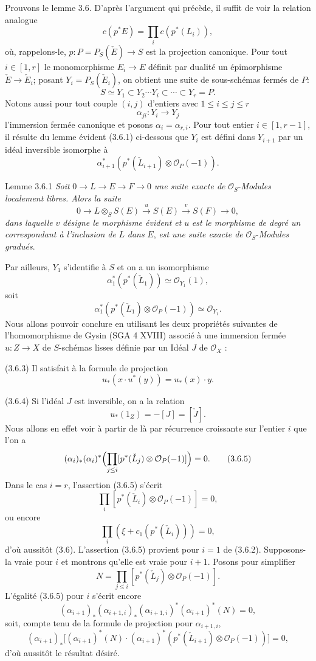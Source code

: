 Prouvons le lemme 3.6. D'après l'argument qui précède, il suffit de voir la relation analogue
\[
c(p^*E)=\prod_i c(p^*(L_i)),
\]
où, rappelons-le, $p:P=P_S(\check E)\to S$ est la projection canonique. Pour tout $i\in[1,r]$ le monomorphisme $E_i\to E$ définit par dualité un épimorphisme $\check E\to\check E_i$; posant $Y_i=P_S(\check E_i)$, on obtient une suite de sous-schémas fermés de $P$:
\[
S\simeq Y_1\subset Y_2\cdots Y_i\subset\cdots\subset Y_r=P.
\]
Notons aussi pour tout couple $(i,j)$ d'entiers avec $1\le i\le j\le r$
\[
\alpha_{ji}:Y_i\to Y_j
\]
l'immersion fermée canonique et posons $\alpha_i=\alpha_{r,i}$. Pour tout entier $i\in[1,r-1]$, il résulte du lemme évident (3.6.1) ci-dessous que $Y_i$ est défini dans $Y_{i+1}$ par un idéal inversible isomorphe à
\[
\alpha_{i+1}^*(p^*(\check L_{i+1})\otimes\mathcal{O}_P(-1)).
\]

\begin{statement}{Lemme 3.6.1}
\emph{Soit} $0\to L\to E\to F\to0$ \emph{une suite exacte de} $\mathcal{O}_S$-\emph{Modules localement libres. Alors la suite}
\[
0\to L\otimes_S S(E)\xrightarrow{u}S(E)\xrightarrow{v}S(F)\to0,
\]
\emph{dans laquelle} $v$ \emph{désigne le morphisme évident et} $u$ \emph{est le morphisme de degré un correspondant à l'inclusion de} $L$ \emph{dans} $E$, \emph{est une suite exacte de} $\mathcal{O}_S$-\emph{Modules gradués}.
\end{statement}

Par
ailleurs, $Y_1$ s'identifie à $S$ et on a un isomorphisme
\[
\alpha_1^*(p^*(\check L_1))\simeq\mathcal{O}_{Y_1}(1),
\]
soit
\[
\alpha_1^*(p^*(\check L_1)\otimes\mathcal{O}_P(-1))\simeq \mathcal{O}_{Y_1}.
\tag{3.6.2.}
\]
Nous allons pouvoir conclure en utilisant les deux propriétés suivantes de l'homomorphisme de Gysin (SGA 4 XVIII) associé à une immersion fermée $u:Z\to X$ de $S$-schémas lisses définie par un Idéal $J$ de $\mathcal{O}_X$ :

(3.6.3) Il satisfait à la formule de projection
\[
u_*(x\cdot u^*(y))=u_*(x)\cdot y.
\]

(3.6.4) Si l'idéal $J$ est inversible, on a la relation
\[
u_*(1_Z)=-[J]=[\check J].
\]
Nous allons en effet voir à partir de là par récurrence croissante sur l'entier $i$ que l'on a
\[
(\alpha_i)_*(\alpha_i)^*\Bigl(\prod_{j\le i}[p^*(\check L_j)\otimes\mathcal{O}_P(-1)]\Bigr)=0.
\tag{3.6.5}
\]
Dans le cas $i=r$, l'assertion (3.6.5) s'écrit
\[
\prod_i[p^*(\check L_i)\otimes\mathcal{O}_P(-1)]=0,
\]
ou encore
\[
\prod_i(\xi+c_1(p^*(\check L_i)))=0,
\]
d'où aussitôt (3.6). L'assertion (3.6.5) provient pour $i=1$ de (3.6.2). Supposons-la vraie pour $i$ et montrons qu'elle est vraie pour $i+1$. Posons pour simplifier
\[
N=\prod_{j\le i}[p^*(\check L_j)\otimes\mathcal{O}_P(-1)].
\]
L'égalité (3.6.5) pour $i$ s'écrit encore
\[
(\alpha_{i+1})_*(\alpha_{i+1,i})_*(\alpha_{i+1,i})^*(\alpha_{i+1})^*(N)=0,
\]
soit, compte tenu de la formule de projection pour $\alpha_{i+1,i}$,
\[
(\alpha_{i+1})_*\bigl[(\alpha_{i+1})^*(N)\cdot(\alpha_{i+1})^*(p^*(\check L_{i+1})\otimes\mathcal{O}_P(-1))\bigr]=0,
\]
d'où aussitôt le
résultat désiré.

